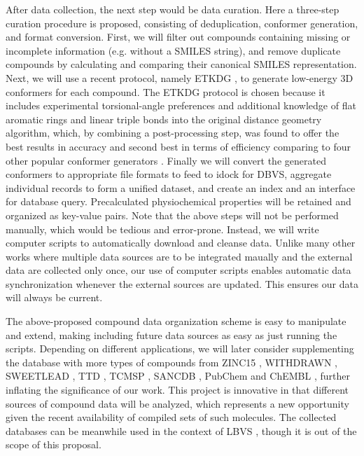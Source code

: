 \documentclass[a4paper,12pt]{article}
\begin{document}
After data collection, the next step would be data curation. Here a three-step curation procedure is proposed, consisting of deduplication, conformer generation, and format conversion. First, we will filter out compounds containing missing or incomplete information (e.g. without a SMILES string), and remove duplicate compounds by calculating and comparing their canonical SMILES representation. Next, we will use a recent protocol, namely ETKDG \citep{1697}, to generate low-energy 3D conformers for each compound. The ETKDG protocol is chosen because it includes experimental torsional-angle preferences and additional knowledge of flat aromatic rings and linear triple bonds into the original distance geometry algorithm, which, by combining a post-processing step, was found to offer the best results in accuracy and second best in terms of efficiency comparing to four other popular conformer generators \citep{1127}. Finally we will convert the generated conformers to appropriate file formats to feed to idock for DBVS, aggregate individual records to form a unified dataset, and create an index and an interface for database query. Precalculated physiochemical properties will be retained and organized as key-value pairs. Note that the above steps will not be performed manually, which would be tedious and error-prone. Instead, we will write computer scripts to automatically download and cleanse data. Unlike many other works where multiple data sources are to be integrated maually and the external data are collected only once, our use of computer scripts enables automatic data synchronization whenever the external sources are updated. This ensures our data will always be current.

The above-proposed compound data organization scheme is easy to manipulate and extend, making including future data sources as easy as just running the scripts. Depending on different applications, we will later consider supplementing the database with more types of compounds from ZINC15 \citep{1688}, WITHDRAWN \citep{1718}, SWEETLEAD \citep{1511}, TTD \citep{1790}, TCMSP \citep{1375}, SANCDB \citep{1680}, PubChem \citep{1701} and ChEMBL \citep{1424}, further inflating the significance of our work. This project is innovative in that different sources of compound data will be analyzed, which represents a new opportunity given the recent availability of compiled sets of such molecules. The collected databases can be meanwhile used in the context of LBVS \citep{1749}, though it is out of the scope of this proposal.
\end{document}
